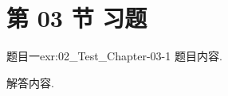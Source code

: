 \section{第 03 节 习题}


\begin{exercise}{题目一}{exr:02_Test_Chapter-03-1}
    题目内容.
\end{exercise}

\begin{solution}
    解答内容.
\end{solution}
